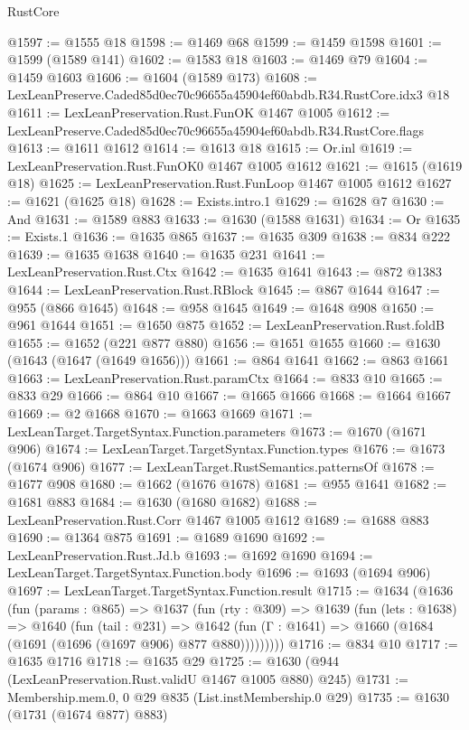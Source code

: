 \begin{lexlean}{RustCore}
\begin{coremodule}
@1597 := @1555 @18
@1598 := @1469 @68
@1599 := @1459 @1598
@1601 := @1599 (@1589 @141)
@1602 := @1583 @18
@1603 := @1469 @79
@1604 := @1459 @1603
@1606 := @1604 (@1589 @173)
@1608 := LexLeanPreserve.Caded85d0ec70c96655a45904ef60abdb.R34.RustCore.idx3 @18
@1611 := LexLeanPreservation.Rust.FunOK @1467 @1005
@1612 := LexLeanPreserve.Caded85d0ec70c96655a45904ef60abdb.R34.RustCore.flags
@1613 := @1611 @1612
@1614 := @1613 @18
@1615 := Or.inl
@1619 := LexLeanPreservation.Rust.FunOK0 @1467 @1005 @1612
@1621 := @1615 (@1619 @18)
@1625 := LexLeanPreservation.Rust.FunLoop @1467 @1005 @1612
@1627 := @1621 (@1625 @18)
@1628 := Exists.intro.{1}
@1629 := @1628 @7
@1630 := And
@1631 := @1589 @883
@1633 := @1630 (@1588 @1631)
@1634 := Or
@1635 := Exists.{1}
@1636 := @1635 @865
@1637 := @1635 @309
@1638 := @834 @222
@1639 := @1635 @1638
@1640 := @1635 @231
@1641 := LexLeanPreservation.Rust.Ctx
@1642 := @1635 @1641
@1643 := @872 @1383
@1644 := LexLeanPreservation.Rust.RBlock
@1645 := @867 @1644
@1647 := @955 (@866 @1645)
@1648 := @958 @1645
@1649 := @1648 @908
@1650 := @961 @1644
@1651 := @1650 @875
@1652 := LexLeanPreservation.Rust.foldB
@1655 := @1652 (@221 @877 @880)
@1656 := @1651 @1655
@1660 := @1630 (@1643 (@1647 (@1649 @1656)))
@1661 := @864 @1641
@1662 := @863 @1661
@1663 := LexLeanPreservation.Rust.paramCtx
@1664 := @833 @10
@1665 := @833 @29
@1666 := @864 @10
@1667 := @1665 @1666
@1668 := @1664 @1667
@1669 := @2 @1668
@1670 := @1663 @1669
@1671 := LexLeanTarget.TargetSyntax.Function.parameters
@1673 := @1670 (@1671 @906)
@1674 := LexLeanTarget.TargetSyntax.Function.types
@1676 := @1673 (@1674 @906)
@1677 := LexLeanTarget.RustSemantics.patternsOf
@1678 := @1677 @908
@1680 := @1662 (@1676 @1678)
@1681 := @955 @1641
@1682 := @1681 @883
@1684 := @1630 (@1680 @1682)
@1688 := LexLeanPreservation.Rust.Corr @1467 @1005 @1612
@1689 := @1688 @883
@1690 := @1364 @875
@1691 := @1689 @1690
@1692 := LexLeanPreservation.Rust.Jd.b
@1693 := @1692 @1690
@1694 := LexLeanTarget.TargetSyntax.Function.body
@1696 := @1693 (@1694 @906)
@1697 := LexLeanTarget.TargetSyntax.Function.result
@1715 := @1634
    (@1636
      (fun (params : @865) =>
      @1637
        (fun (rty : @309) =>
        @1639
          (fun (lets : @1638) =>
          @1640
            (fun (tail : @231) =>
            @1642 (fun (Γ : @1641) => @1660 (@1684 (@1691 (@1696 (@1697 @906) @877 @880)))))))))
@1716 := @834 @10
@1717 := @1635 @1716
@1718 := @1635 @29
@1725 := @1630 (@944 (LexLeanPreservation.Rust.validU @1467 @1005 @880) @245)
@1731 := Membership.mem.{0, 0} @29 @835 (List.instMembership.{0} @29)
@1735 := @1630 (@1731 (@1674 @877) @883)

\end{coremodule}
\end{lexlean}
